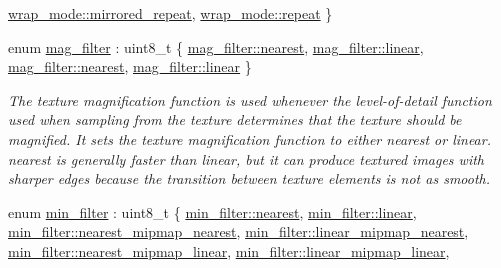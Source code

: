 \begin{DoxyCompactItemize}
\newline
\mbox{\hyperlink{namespacemoka_afda3faa87bacaacc6008d8c1f73f6462a301defc6e7425fc63ef35c7827d43b44}{wrap\+\_\+mode\+::mirrored\+\_\+repeat}}, 
\mbox{\hyperlink{namespacemoka_afda3faa87bacaacc6008d8c1f73f6462a32cf6da134a8b268cf4ab6b79a9a5ad9}{wrap\+\_\+mode\+::repeat}}
 \}
\item 
enum \mbox{\hyperlink{namespacemoka_a2391e4ae99494b70d0226ee0e586f33c}{mag\+\_\+filter}} \+: uint8\+\_\+t \{ \mbox{\hyperlink{namespacemoka_a2391e4ae99494b70d0226ee0e586f33cad879c351426770bc0b13c3628db1e636}{mag\+\_\+filter\+::nearest}}, 
\mbox{\hyperlink{namespacemoka_a2391e4ae99494b70d0226ee0e586f33ca9a932b3cb396238423eb2f33ec17d6aa}{mag\+\_\+filter\+::linear}}, 
\mbox{\hyperlink{namespacemoka_a2391e4ae99494b70d0226ee0e586f33cad879c351426770bc0b13c3628db1e636}{mag\+\_\+filter\+::nearest}}, 
\mbox{\hyperlink{namespacemoka_a2391e4ae99494b70d0226ee0e586f33ca9a932b3cb396238423eb2f33ec17d6aa}{mag\+\_\+filter\+::linear}}
 \}
\begin{DoxyCompactList}\small\item\em The texture magnification function is used whenever the level-\/of-\/detail function used when sampling from the texture determines that the texture should be magnified. It sets the texture magnification function to either nearest or linear. nearest is generally faster than linear, but it can produce textured images with sharper edges because the transition between texture elements is not as smooth. \end{DoxyCompactList}\item 
enum \mbox{\hyperlink{namespacemoka_afeea6a53d61ee8561c91c62f5a051a77}{min\+\_\+filter}} \+: uint8\+\_\+t \{ \newline
\mbox{\hyperlink{namespacemoka_afeea6a53d61ee8561c91c62f5a051a77ad879c351426770bc0b13c3628db1e636}{min\+\_\+filter\+::nearest}}, 
\mbox{\hyperlink{namespacemoka_afeea6a53d61ee8561c91c62f5a051a77a9a932b3cb396238423eb2f33ec17d6aa}{min\+\_\+filter\+::linear}}, 
\mbox{\hyperlink{namespacemoka_afeea6a53d61ee8561c91c62f5a051a77a250bf16c3da0b23fd429f9ee3beaad82}{min\+\_\+filter\+::nearest\+\_\+mipmap\+\_\+nearest}}, 
\mbox{\hyperlink{namespacemoka_afeea6a53d61ee8561c91c62f5a051a77a6a86be4e956a2dad5b8fcbf557b144cc}{min\+\_\+filter\+::linear\+\_\+mipmap\+\_\+nearest}}, 
\newline
\mbox{\hyperlink{namespacemoka_afeea6a53d61ee8561c91c62f5a051a77aad58f1ac69ffd6aad90f37b79c187806}{min\+\_\+filter\+::nearest\+\_\+mipmap\+\_\+linear}}, 
\mbox{\hyperlink{namespacemoka_afeea6a53d61ee8561c91c62f5a051a77a1bdd53f0fc057644ac46aa6a083d316f}{min\+\_\+filter\+::linear\+\_\+mipmap\+\_\+linear}}, 

\end{DoxyCompactItemize}
